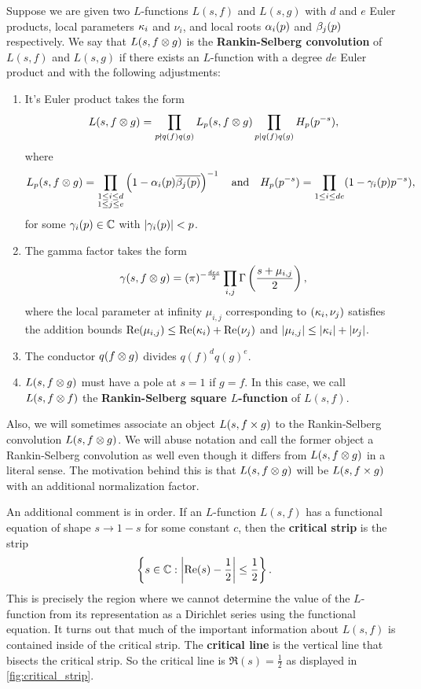       Suppose we are given two $L$-functions $L(s,f)$ and $L(s,g)$ with $d$ and $e$ Euler products, local parameters $\kappa_{i}$ and $\nu_{i}$, and local roots $\alpha_{i}(p)$ and $\beta_{j}(p)$ respectively. We say that $L(s,f \otimes g)$ is the \textbf{Rankin-Selberg convolution} of $L(s,f)$ and $L(s,g)$ if there exists an $L$-function with a degree $de$ Euler product and with the following adjustments:
      \begin{enumerate}[label=(\roman*)]
        \item It's Euler product takes the form
        \[
          L(s,f \otimes g) = \prod_{p \nmid q(f)q(g)}L_{p}(s,f \otimes g)\prod_{p \mid q(f)q(g)}H_{p}(p^{-s}),
        \]
        where
        \[
          L_{p}(s,f \otimes g) = \prod_{\substack{1 \le i \le d \\ 1 \le j \le e}}\left(1-\alpha_{i}(p)\overline{\beta_{j}(p)}\right)^{-1} \quad \text{and} \quad H_{p}(p^{-s}) = \prod_{1 \le i \le de}(1-\gamma_{i}(p)p^{-s}),
        \]
        for some $\gamma_{i}(p) \in \mathbb{C}$ with $|\gamma_{i}(p)| < p$.
        \item The gamma factor takes the form
        \[
          \gamma(s,f \otimes g) = (\pi)^{-\frac{des}{2}}\prod_{i,j}\Gamma\left(\frac{s+\mu_{i,j}}{2}\right),
        \]
        where the local parameter at infinity $\mu_{i,j}$ corresponding to $(\kappa_{i},\nu_{j})$ satisfies the addition bounds $\mathrm{Re}(\mu_{i,j}) \le \mathrm{Re}(\kappa_{i})+\mathrm{Re}(\nu_{j})$ and $|\mu_{i,j}| \le |\kappa_{i}|+|\nu_{j}|$.
        \item The conductor $q(f \otimes g)$ divides $q(f)^{d}q(g)^{e}$.
        \item $L(s,f \otimes g)$ must have a pole at $s = 1$ if $g = f$. In this case, we call $L(s,f \otimes f)$ the \textbf{Rankin-Selberg square $L$-function} of $L(s,f)$.
      \end{enumerate}
      Also, we will sometimes associate an object $L(s,f \times g)$ to the Rankin-Selberg convolution $L(s,f \otimes g)$. We will abuse notation and call the former object a Rankin-Selberg convolution as well even though it differs from $L(s,f \otimes g)$ in a literal sense. The motivation behind this is that $L(s,f \otimes g)$ will be $L(s,f \times g)$ with an additional normalization factor.

      An additional comment is in order. If an $L$-function $L(s,f)$ has a functional equation of shape $s \to 1-s$ for some constant $c$, then the \textbf{critical strip} is the strip
      \[
        \left\{s \in \mathbb{C}:\left|\mathrm{Re}(s)-\frac{1}{2}\right| \le \frac{1}{2}\right\}.
      \]
      This is precisely the region where we cannot determine the value of the $L$-function from its representation as a Dirichlet series using the functional equation. It turns out that much of the important information about $L(s,f)$ is contained inside of the critical strip. The \textbf{critical line} is the vertical line that bisects the critical strip. So the critical line is $\Re(s) = \frac{1}{2}$ as displayed in \cref{fig:critical_strip}.

